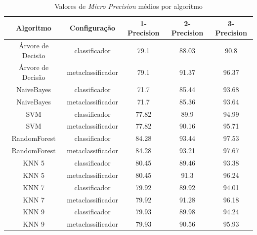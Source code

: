 \begin{table}[h!]
  \begin{center}
    \resizebox{\textwidth}{!} {
    \begin{tabular}{ccccc}
      \hline
      \textbf{Algoritmo} & \textbf{Configuração} & \textbf{1-Precision} & \textbf{2-Precision} & \textbf{3-Precision}\\
      \hline

Árvore de Decisão	&	classificador	&	79.1	&	88.03	&	90.8	\\
Árvore de Decisão	&	metaclassificador	&	79.1	&	91.37	&	96.37	\\
NaiveBayes	&	classificador	&	71.7	&	85.44	&	93.68	\\
NaiveBayes	&	metaclassificador	&	71.7	&	85.36	&	93.64	\\
SVM	&	classificador	&	77.82	&	89.9	&	94.99	\\
SVM	&	metaclassificador	&	77.82	&	90.16	&	95.71	\\
RandomForest	&	classificador	&	84.28	&	93.44	&	97.53	\\
RandomForest	&	metaclassificador	&	84.28	&	93.21	&	97.67	\\
KNN 5	&	classificador	&	80.45	&	89.46	&	93.38	\\
KNN 5	&	metaclassificador	&	80.45	&	91.3	&	96.24	\\
KNN 7	&	classificador	&	79.92	&	89.92	&	94.01	\\
KNN 7	&	metaclassificador	&	79.92	&	91.28	&	96.18	\\
KNN 9	&	classificador	&	79.93	&	89.98	&	94.24	\\
KNN 9	&	metaclassificador	&	79.93	&	90.56	&	95.93	\\

      \hline
    \end{tabular}
    }
    \caption{Valores de \textit{Micro Precision} médios por algoritmo}
    \label{tab:prec_micro}
  \end{center}
\end{table}


